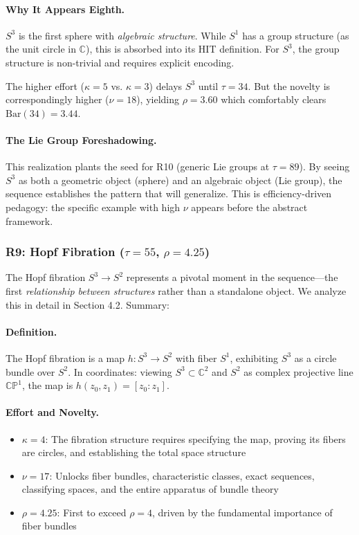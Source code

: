 \documentclass[11pt]{article}
\theoremstyle{definition}
\begin{document}
\paragraph{Why It Appears Eighth.}
$S^3$ is the first sphere with \emph{algebraic structure}. While $S^1$ has a group structure (as the unit circle in $\mathbb{C}$), this is absorbed into its HIT definition. For $S^3$, the group structure is non-trivial and requires explicit encoding.

The higher effort ($\kappa=5$ vs. $\kappa=3$) delays $S^3$ until $\tau=34$. But the novelty is correspondingly higher ($\nu=18$), yielding $\rho=3.60$ which comfortably clears $\text{Bar}(34) = 3.44$.

\paragraph{The Lie Group Foreshadowing.}
This realization plants the seed for R10 (generic Lie groups at $\tau=89$). By seeing $S^3$ as both a geometric object (sphere) and an algebraic object (Lie group), the sequence establishes the pattern that will generalize. This is efficiency-driven pedagogy: the specific example with high $\nu$ appears before the abstract framework.

\subsubsection{R9: Hopf Fibration ($\tau=55$, $\rho=4.25$)}

The Hopf fibration $S^3 \to S^2$ represents a pivotal moment in the sequence—the first \emph{relationship between structures} rather than a standalone object. We analyze this in detail in Section 4.2. Summary:

\paragraph{Definition.}
The Hopf fibration is a map $h : S^3 \to S^2$ with fiber $S^1$, exhibiting $S^3$ as a circle bundle over $S^2$. In coordinates: viewing $S^3 \subset \mathbb{C}^2$ and $S^2$ as complex projective line $\mathbb{CP}^1$, the map is $h(z_0, z_1) = [z_0 : z_1]$.

\paragraph{Effort and Novelty.}
\begin{itemize}
\item $\kappa = 4$: The fibration structure requires specifying the map, proving its fibers are circles, and establishing the total space structure
\item $\nu = 17$: Unlocks fiber bundles, characteristic classes, exact sequences, classifying spaces, and the entire apparatus of bundle theory
\item $\rho = 4.25$: First to exceed $\rho=4$, driven by the fundamental importance of fiber bundles
\end{itemize}
\end{document}
